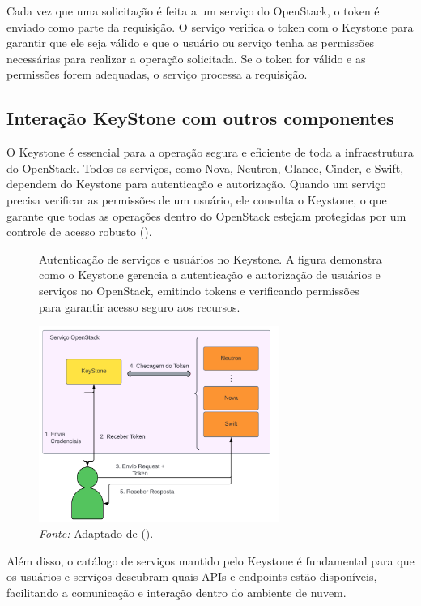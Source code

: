 Cada vez que uma solicitação é feita a um serviço do OpenStack, o token é enviado como parte da requisição. O serviço verifica o token com o Keystone para garantir que ele seja válido e que o usuário ou serviço tenha as permissões necessárias para realizar a operação solicitada. Se o token for válido e as permissões forem adequadas, o serviço processa a requisição.

\subsection{Interação KeyStone com outros componentes}
O Keystone é essencial para a operação segura e eficiente de toda a infraestrutura do OpenStack. Todos os serviços, como Nova, Neutron, Glance, Cinder, e Swift, dependem do Keystone para autenticação e autorização. Quando um serviço precisa verificar as permissões de um usuário, ele consulta o Keystone, o que garante que todas as operações dentro do OpenStack estejam protegidas por um controle de acesso robusto (\cite{da2018self}).

\begin{figure}[htbp]
  \centering
  \caption{Autenticação de serviços e usuários no Keystone. A figura demonstra como o Keystone gerencia a autenticação e autorização de usuários e serviços no OpenStack, emitindo tokens e verificando permissões para garantir acesso seguro aos recursos.}
  \includegraphics[width=0.7\textwidth]{images/keystone_architecture_2.png}
  \caption*{\textit{Fonte:} Adaptado de (\cite{da2018self}).}
  \label{fig:keystone_architecture}
\end{figure}


Além disso, o catálogo de serviços mantido pelo Keystone é fundamental para que os usuários e serviços descubram quais APIs e endpoints estão disponíveis, facilitando a comunicação e interação dentro do ambiente de nuvem.

